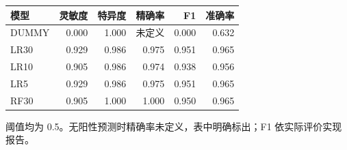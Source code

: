 \begin{center}
\small
\setlength{\tabcolsep}{5pt}
\renewcommand{\arraystretch}{1.25}
\begin{tabular}{lrrrrr}
\toprule
模型 & 灵敏度 & 特异度 & 精确率 & F1 & 准确率 \tabularnewline
\midrule
DUMMY & 0.000 & 1.000 & 未定义 & 0.000 & 0.632 \tabularnewline
LR30 & 0.929 & 0.986 & 0.975 & 0.951 & 0.965 \tabularnewline
LR10 & 0.905 & 0.986 & 0.974 & 0.938 & 0.956 \tabularnewline
LR5 & 0.929 & 0.986 & 0.975 & 0.951 & 0.965 \tabularnewline
RF30 & 0.905 & 1.000 & 1.000 & 0.950 & 0.965 \tabularnewline
\bottomrule
\end{tabular}
\end{center}
{\footnotesize 阈值均为 0.5。无阳性预测时精确率未定义，表中明确标出；F1 依实际评价实现报告。}
